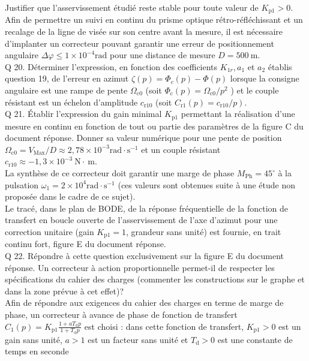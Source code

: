 \documentclass[10pt]{article}
\begin{document}
Justifier que l'asservissement étudié reste stable pour toute valeur de $K_{\mathrm{p} 1}>0$.\\
Afin de permettre un suivi en continu du prisme optique rétro-réfléchissant et un recalage de la ligne de visée sur son centre avant la mesure, il est nécessaire d'implanter un correcteur pouvant garantir une erreur de positionnement angulaire $\Delta \varphi \leqslant 1 \times 10^{-4} \mathrm{rad}$ pour une distance de mesure $D=500 \mathrm{~m}$.\\
Q 20. Déterminer l'expression, en fonction des coefficients $K_{1 r}, a_{1}$ et $a_{2}$ établis question 19, de l'erreur en azimut $\zeta(p)=\Phi_{c}(p)-\Phi(p)$ lorsque la consigne angulaire est une rampe de pente $\Omega_{\mathrm{c} 0}$ (soit $\Phi_{\mathrm{c}}(p)=\Omega_{\mathrm{c} 0} / p^{2}$ ) et le couple résistant est un échelon d'amplitude $c_{\mathrm{r} 10}$ (soit $\left.C_{\mathrm{r} 1}(p)=c_{\mathrm{r} 10} / p\right)$.\\
Q 21. Établir l'expression du gain minimal $K_{\mathrm{p} 1}$ permettant la réalisation d'une mesure en continu en fonction de tout ou partie des paramètres de la figure C du document réponse. Donner sa valeur numérique pour une pente de position $\Omega_{\mathrm{c} 0}=V_{\mathrm{Max}} / D \approx 2,78 \times 10^{-3} \mathrm{rad} \cdot \mathrm{s}^{-1}$ et un couple résistant $c_{\mathrm{r} 10} \approx-1,3 \times 10^{-3} \mathrm{~N} \cdot \mathrm{~m}$.\\
La synthèse de ce correcteur doit garantir une marge de phase $M_{\mathrm{Ph}}=45^{\circ}$ à la pulsation $\omega_{1}=2 \times 10^{4} \mathrm{rad} \cdot \mathrm{s}^{-1}$ (ces valeurs sont obtenues suite à une étude non proposée dans le cadre de ce sujet).\\
Le tracé, dans le plan de BODE, de la réponse fréquentielle de la fonction de transfert en boucle ouverte de l'asservissement de l'axe d'azimut pour une correction unitaire (gain $K_{\mathrm{p} 1}=1$, grandeur sans unité) est fournie, en trait continu fort, figure E du document réponse.\\
Q 22. Répondre à cette question exclusivement sur la figure E du document réponse. Un correcteur à action proportionnelle permet-il de respecter les spécifications du cahier des charges (commenter les constructions sur le graphe et dans la zone prévue à cet effet)?\\
Afin de répondre aux exigences du cahier des charges en terme de marge de phase, un correcteur à avance de phase de fonction de transfert $C_{1}(p)=K_{\mathrm{p} 1} \frac{1+a T_{\mathrm{d}} p}{1+T_{\mathrm{d}} p}$ est choisi : dans cette fonction de transfert, $K_{\mathrm{p} 1}>0$ est un gain sans unité, $a>1$ est un facteur sans unité et $T_{\mathrm{d}}>0$ est une constante de temps en seconde\\
\end{document}
